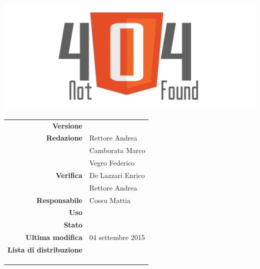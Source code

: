 \thispagestyle{empty}

\begin{titlepage}

	\begin{center}
	\begin{Huge}
		\textbf{\gruppo} \\
	\end{Huge}
	\vspace{0.5cm}
	\begin{Large}
		\textbf{\capitolato}
	\end{Large}
	
	\vspace{1cm}

	\includegraphics[scale=0.35]{../logo/logo404_Extends.png}
	\vspace{1cm}
	\begin{Huge}
		\textbf{\titDoc}
	\end{Huge}
	
	\vspace{1cm}
	
	\begin{table}[h]
	\begin{center}
	\begin{tabular}{r | l}
		\textbf{Versione} & \versione \\
		\textbf{Redazione} & Rettore Andrea \\ 
			& Camborata Marco \\ 
			& Vegro Federico \\
		\textbf{Verifica} & De Lazzari Enrico \\ 
			& Rettore Andrea \\ 
		\textbf{Responsabile} & Cossu Mattia \\
		\textbf{Uso} & \uso \\
		\textbf{Stato} & \stato \\
		\textbf{Ultima modifica} & 04 settembre 2015 \\
		\textbf{Lista di distribuzione} & \gruppo \\ 
			& \Vardanega \\
			& \Cardin \\
			& \Zucchetti \\
	\end{tabular}
	\end{center}
	\end{table}
	\end{center}
\end{titlepage}
